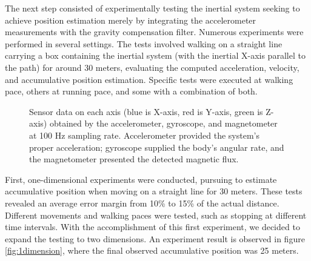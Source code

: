 The next step consisted of experimentally testing the inertial system seeking to achieve position estimation merely by integrating the accelerometer measurements with the gravity compensation filter. Numerous experiments were performed in several settings. The tests involved walking on a straight line carrying a box containing the inertial system (with the inertial X-axis parallel to the path) for around 30 meters, evaluating the computed acceleration, velocity, and accumulative position estimation. Specific tests were executed at walking pace, others at running pace, and some with a combination of both.

%     
%     
%     

\begin{figure}[!h]
    \centering
    \resizebox{1\linewidth}{!}{}
    \caption{Sensor data on each axis (blue is X-axis, red is Y-axis, green is Z-axis) obtained by the accelerometer, gyroscope, and magnetometer at 100 Hz sampling rate. Accelerometer provided the system’s proper acceleration; gyroscope supplied the body’s angular rate, and the magnetometer presented the detected magnetic flux.}
    \label{fig:sensoroutput}
\end{figure}

First, one-dimensional experiments were conducted, pursuing to estimate accumulative position when moving on a straight line for 30 meters. These tests revealed an average error margin from 10\% to 15\% of the actual distance. Different movements and walking paces were tested, such as stopping at different time intervals. With the accomplishment of this first experiment, we decided to expand the testing to two dimensions. An experiment result is observed in figure \ref{fig:1dimension}, where the final observed accumulative position was 25 meters.

%     

